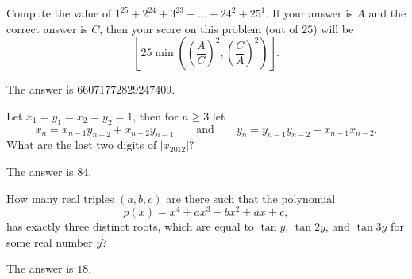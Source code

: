 %	







\begin{question}[name={2013 HMMT, Guts, \href{https://artofproblemsolving.com/community/c129h526573p2986253}{Problem 33}}]
	Compute the value of $1^{25}+2^{24}+3^{23}+\ldots+24^2+25^1$. If your answer is $A$ and the correct answer is $C$, then your score on this problem (out of $25$) will be $$\left\lfloor25\min\left(\left(\frac AC\right)^2,\left(\frac CA\right)^2\right)\right\rfloor.$$
\end{question}




\begin{solution}
	The answer is $\boxed{66071772829247409}$.
\end{solution}









\begin{question}[name={2012 HMMT, Algebra, \href{https://artofproblemsolving.com/community/c129h521066p2934967}{Problem 8}}]
	Let $x_1=y_1=x_2=y_2=1$, then for $n\geq 3$ let $$x_n=x_{n-1}y_{n-2}+x_{n-2}y_{n-1} \qquad \text{and}\qquad y_n=y_{n-1}y_{n-2}-x_{n-1}x_{n-2}.$$ What are the last two digits of $|x_{2012}|$?
\end{question}




\begin{solution}
	The answer is $\boxed{84}$.
\end{solution}







\begin{question}[name={2012 HMMT, Algebra, \href{https://artofproblemsolving.com/community/c129h521067p2934968}{Problem 9}}]
	How many real triples $(a,b,c)$ are there such that the polynomial $$p(x)=x^4+ax^3+bx^2+ax+c,$$ has exactly three distinct roots, which are equal to $\tan y$, $\tan 2y$, and $\tan 3y$ for some real number $y$?	
\end{question}




\begin{solution}
	The answer is $\boxed{18}$.
\end{solution}


